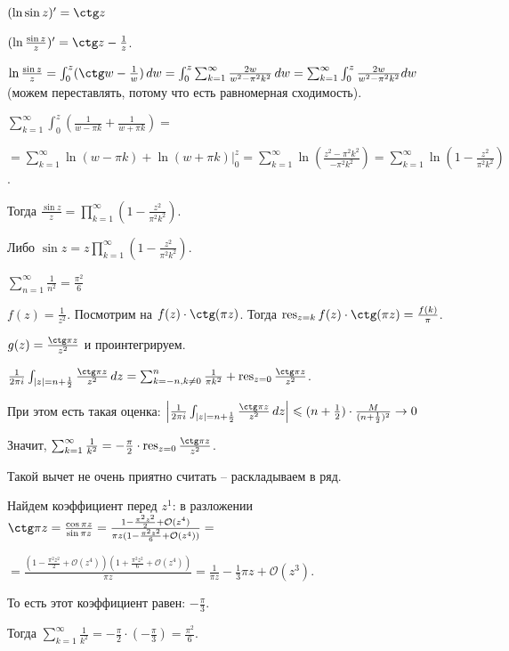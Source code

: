 \begin{example}
    $(\ln \sin z)' = \ctg z$

    $(\ln \frac{\sin z}{z})' = \ctg z - \frac{1}{z}$.

    $\ln \frac{\sin z}{z} = \int_{0}^{z} (\ctg w - \frac{1}{w}) \, dw = \int_{0}^{z} \sum_{k=1}^{\infty} \frac{2w}{w^2 - \pi^2 k^2} \, dw =
    \sum_{k = 1}^{\infty} \int_{0}^{z} {\frac{2w}{w^2 - \pi^2 k^2} dw}$ (можем переставлять, потому что есть равномерная сходимость).

    $\sum_{k = 1}^{\infty} \int_{0}^{z} \left ( \frac{1}{w - \pi k} + \frac{1}{w + \pi k} \right ) =$

    $= \sum_{k = 1}^{\infty} \ln (w - \pi k) + \ln (w + \pi k) \bigg |_{0}^z = \sum_{k = 1}^{\infty} \ln
    \left ( \frac{z^2 - \pi^2 k^2}{-\pi^2 k^2} \right ) = \sum_{k = 1}^{\infty} \ln \left ( 1 - \frac{z^2}{\pi^2 k^2} \right )$.

    Тогда $\frac{\sin z}{z} = \prod_{k = 1}^{\infty} \left(1 - \frac{z^2}{\pi^2 k^2} \right)$.

    Либо $\sin z = z \prod_{k = 1}^{\infty} \left(1 - \frac{z^2}{\pi^2 k^2} \right)$.
\end{example}

\begin{example}
    $\sum_{n = 1}^{\infty} \frac{1}{n^2} = \frac{\pi^2}{6}$

    $f(z) = \frac{1}{z^2}$. Посмотрим на $f(z) \cdot \ctg (\pi z)$. Тогда
    $\res_{z = k} f(z) \cdot \ctg (\pi z) = \frac{f(k)}{\pi}$.

    $g(z) = \frac{\ctg \pi z}{z^2}$ и проинтегрируем.

    $\frac{1}{2 \pi i} \int_{|z| = n + \frac{1}{2}} \frac{\ctg \pi z}{z^2} \, dz =
    \sum_{k = -n, k \neq 0}^n \frac{1}{\pi k^2} + \res_{z = 0} \frac{\ctg \pi z}{z^2}$.

    При этом есть такая оценка:
    $\left | \frac{1}{2 \pi i} \int_{|z| = n + \frac{1}{2}} \frac{\ctg \pi z}{z^2} \, dz \right | \leqslant
    (n + \frac{1}{2}) \cdot \frac{M}{(n + \frac{1}{2})^2} \rightarrow 0$

    Значит, $\sum_{k = 1}^{\infty} \frac{1}{k^2} = -\frac{\pi}{2} \cdot \res_{z = 0} \frac{\ctg \pi z}{z^2}$.

    Такой вычет не очень приятно считать -- раскладываем в ряд.

    Найдем коэффициент перед $z^1$: в разложении $\ctg \pi z = \frac{\cos \pi z}{\sin \pi z} = \frac{1 - \frac{\pi^2 z^2}{2} + \mathcal{O}(z^4)}{\pi z (1 - \frac{\pi^2 z^2}{6} + \mathcal{O}(z^4))} = $


    $ = \frac{(1 - \frac{\pi^2 z^2}{2} + \mathcal{O}(z^4))(1 + \frac{\pi^2 z^2}{6} + \mathcal{O}(z^4))}{\pi z} = \frac{1}{\pi z} - \frac{1}{3} \pi z + \mathcal{O}(z^3)$.

    То есть этот коэффициент равен: $-\frac{\pi}{3}$.

    Тогда $\sum_{k = 1}^{\infty} \frac{1}{k^2} = -\frac{\pi}{2} \cdot (-\frac{\pi}{3}) = \frac{\pi^2}{6}$.
\end{example}

